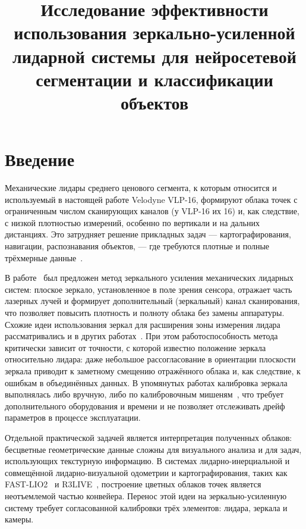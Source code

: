 \documentclass{misisarticle}
\title{Исследование эффективности использования зеркально-усиленной
лидарной системы для нейросетевой сегментации и классификации объектов}
\begin{document}
\maketitle

\section{Введение}

Механические лидары среднего ценового сегмента, к которым относится и
используемый в настоящей работе Velodyne VLP-16, формируют облака точек
с ограниченным числом сканирующих каналов (у VLP-16 их 16) и,
как следствие, с низкой плотностью измерений, особенно по вертикали и
на дальних дистанциях. Это затрудняет решение прикладных задач —
картографирования, навигации, распознавания объектов, — где требуются
плотные и полные трёхмерные данные~\cite{khoshelham2018benchmark}.

В работе~\cite{VisFed26} был предложен метод зеркального
усиления механических лидарных систем: плоское зеркало, установленное в
поле зрения сенсора, отражает часть лазерных лучей и формирует
дополнительный (зеркальный) канал сканирования, что позволяет повысить
плотность и полноту облака без замены аппаратуры. Схожие идеи
использования зеркал для расширения зоны измерения лидара
рассматривались и в других
работах~\cite{Matsubara2020MirrorLiDAR,Pogacnik2022MultiperspectiveLiDAR}.
При этом работоспособность метода критически зависит от точности, с
которой известно положение зеркала относительно лидара: даже небольшое
рассогласование в ориентации плоскости зеркала приводит к заметному
смещению отражённого облака и, как следствие, к ошибкам в объединённых
данных. В упомянутых работах калибровка зеркала выполнялась либо
вручную, либо по калибровочным мишеням~\cite{Kibii2022MirrorCalibration},
что требует дополнительного оборудования и времени и не позволяет
отслеживать дрейф параметров в процессе эксплуатации.

Отдельной практической задачей является интерпретация полученных
облаков: бесцветные геометрические данные сложны для визуального
анализа и для задач, использующих текстурную информацию. В системах
лидарно-инерциальной и совмещённой лидарно-визуальной одометрии и
картографирования, таких как FAST-LIO2~\cite{fastlio2} и
R3LIVE~\cite{r3live}, построение цветных облаков точек является
неотъемлемой частью конвейера. Перенос этой идеи на зеркально-усиленную
систему требует согласованной калибровки трёх элементов: лидара,
зеркала и камеры.
\end{document}
